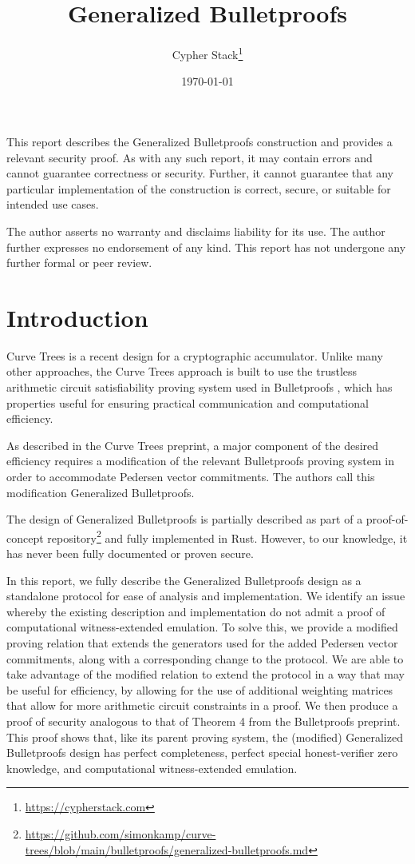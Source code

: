 \documentclass{article}
\title{Generalized Bulletproofs}
\author{Cypher Stack\thanks{\url{https://cypherstack.com}}}
\date{\today}
\begin{document}
\maketitle

This report describes the Generalized Bulletproofs construction and provides a relevant security proof.
As with any such report, it may contain errors and cannot guarantee correctness or security.
Further, it cannot guarantee that any particular implementation of the construction is correct, secure, or suitable for intended use cases.

The author asserts no warranty and disclaims liability for its use.
The author further expresses no endorsement of any kind.
This report has not undergone any further formal or peer review.

\tableofcontents


\section{Introduction}

Curve Trees \cite{curvetrees} is a recent design for a cryptographic accumulator.
Unlike many other approaches, the Curve Trees approach is built to use the trustless arithmetic circuit satisfiability proving system used in Bulletproofs \cite{bp}, which has properties useful for ensuring practical communication and computational efficiency.

As described in the Curve Trees preprint, a major component of the desired efficiency requires a modification of the relevant Bulletproofs proving system in order to accommodate Pedersen vector commitments.
The authors call this modification Generalized Bulletproofs.

The design of Generalized Bulletproofs is partially described as part of a proof-of-concept repository\footnote{\url{https://github.com/simonkamp/curve-trees/blob/main/bulletproofs/generalized-bulletproofs.md}} and fully implemented in Rust.
However, to our knowledge, it has never been fully documented or proven secure.

In this report, we fully describe the Generalized Bulletproofs design as a standalone protocol for ease of analysis and implementation.
We identify an issue whereby the existing description and implementation do not admit a proof of computational witness-extended emulation.
To solve this, we provide a modified proving relation that extends the generators used for the added Pedersen vector commitments, along with a corresponding change to the protocol.
We are able to take advantage of the modified relation to extend the protocol in a way that may be useful for efficiency, by allowing for the use of additional weighting matrices that allow for more arithmetic circuit constraints in a proof.
We then produce a proof of security analogous to that of Theorem 4 from the Bulletproofs preprint.
This proof shows that, like its parent proving system, the (modified) Generalized Bulletproofs design has perfect completeness, perfect special honest-verifier zero knowledge, and computational witness-extended emulation.
\end{document}
